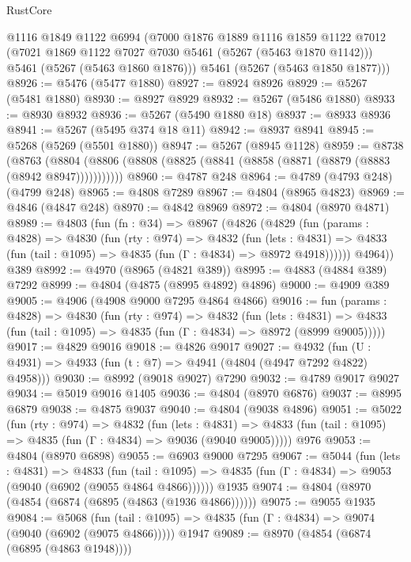 \begin{lexlean}{RustCore}
\begin{coremodule}
      @1116
      @1849
      @1122
      @6994
      (@7000
        @1876
        @1889
        @1116
        @1859
        @1122
        @7012
        (@7021 @1869 @1122 @7027 @7030 @5461 (@5267 (@5463 @1870 @1142)))
        @5461
        (@5267 (@5463 @1860 @1876)))
      @5461
      (@5267 (@5463 @1850 @1877)))
@8926 := @5476 (@5477 @1880)
@8927 := @8924 @8926
@8929 := @5267 (@5481 @1880)
@8930 := @8927 @8929
@8932 := @5267 (@5486 @1880)
@8933 := @8930 @8932
@8936 := @5267 (@5490 @1880 @18)
@8937 := @8933 @8936
@8941 := @5267 (@5495 @374 @18 @11)
@8942 := @8937 @8941
@8945 := @5268 (@5269 (@5501 @1880))
@8947 := @5267 (@8945 @1128)
@8959 := @8738
    (@8763 (@8804 (@8806 (@8808 (@8825 (@8841 (@8858 (@8871 (@8879 (@8883 (@8942 @8947)))))))))))
@8960 := @4787 @248
@8964 := @4789 (@4793 @248) (@4799 @248)
@8965 := @4808 @7289
@8967 := @4804 (@8965 @4823)
@8969 := @4846 (@4847 @248)
@8970 := @4842 @8969
@8972 := @4804 (@8970 @4871)
@8989 := @4803
    (fun (fn : @34) =>
    @8967
      (@4826
        (@4829
          (fun (params : @4828) =>
          @4830
            (fun (rty : @974) =>
            @4832
              (fun (lets : @4831) =>
              @4833 (fun (tail : @1095) => @4835 (fun (Γ : @4834) => @8972 @4918))))))
        @4964))
    @389
@8992 := @4970 (@8965 (@4821 @389))
@8995 := @4883 (@4884 @389) @7292
@8999 := @4804 (@4875 (@8995 @4892) @4896)
@9000 := @4909 @389
@9005 := @4906 (@4908 @9000 @7295 @4864 @4866)
@9016 := fun (params : @4828) =>
  @4830
    (fun (rty : @974) =>
    @4832
      (fun (lets : @4831) =>
      @4833 (fun (tail : @1095) => @4835 (fun (Γ : @4834) => @8972 (@8999 @9005)))))
@9017 := @4829 @9016
@9018 := @4826 @9017
@9027 := @4932 (fun (U : @4931) => @4933 (fun (t : @7) => @4941 (@4804 (@4947 @7292 @4822) @4958)))
@9030 := @8992 (@9018 @9027) @7290
@9032 := @4789 @9017 @9027
@9034 := @5019 @9016 @1405
@9036 := @4804 (@8970 @6876)
@9037 := @8995 @6879
@9038 := @4875 @9037
@9040 := @4804 (@9038 @4896)
@9051 := @5022
    (fun (rty : @974) =>
    @4832
      (fun (lets : @4831) =>
      @4833 (fun (tail : @1095) => @4835 (fun (Γ : @4834) => @9036 (@9040 @9005)))))
    @976
@9053 := @4804 (@8970 @6898)
@9055 := @6903 @9000 @7295
@9067 := @5044
    (fun (lets : @4831) =>
    @4833
      (fun (tail : @1095) => @4835 (fun (Γ : @4834) => @9053 (@9040 (@6902 (@9055 @4864 @4866))))))
    @1935
@9074 := @4804 (@8970 (@4854 (@6874 (@6895 (@4863 (@1936 @4866))))))
@9075 := @9055 @1935
@9084 := @5068
    (fun (tail : @1095) => @4835 (fun (Γ : @4834) => @9074 (@9040 (@6902 (@9075 @4866)))))
    @1947
@9089 := @8970 (@4854 (@6874 (@6895 (@4863 @1948))))

\end{coremodule}
\end{lexlean}
